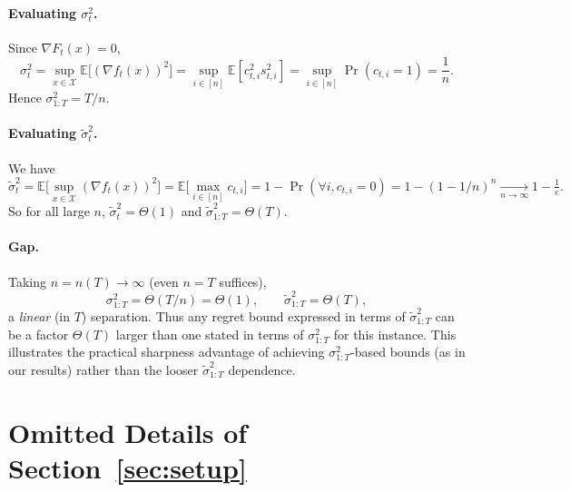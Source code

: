 \documentclass{article}
\theoremstyle{plain}
\theoremstyle{definition}
\theoremstyle{remark}
\newcommand{\cX}{\mathcal{X}}
\renewcommand{\Bbb}{\mathbb}
\newcommand{\E}{{\Bbb E}}
\renewcommand{\tilde}{\widetilde}
\begin{document}
\paragraph{Evaluating $\sigma_t^2$.} Since $\nabla F_t(x)=0$,
\[
\sigma_t^2=\sup_{x\in\cX}\E\big[(\nabla f_t(x))^2\big]=\sup_{i\in[n]}\E[c_{t,i}^2 s_{t,i}^2]
= \sup_{i\in[n]} \Pr(c_{t,i}=1)=\frac{1}{n}.
\]
Hence $\sigma_{1:T}^2 = T/n$.

\paragraph{Evaluating $\tilde{\sigma}_t^2$.} We have
\[
\tilde{\sigma}_t^2=\E\Big[\sup_{x\in\cX} (\nabla f_t(x))^2\Big]=\E\Big[\max_{i\in[n]} c_{t,i}\Big]
=1-\Pr(\forall i, c_{t,i}=0)=1-(1-1/n)^n \xrightarrow[n\to\infty]{} 1-\tfrac{1}{e}.
\]
So for all large $n$, $\tilde{\sigma}_t^2=\Theta(1)$ and $\tilde{\sigma}_{1:T}^2=\Theta(T)$.

\paragraph{Gap.} Taking $n=n(T)\to\infty$ (even $n=T$ suffices),
\begin{equation*}
\sigma_{1:T}^2 = \Theta(T/n)=\Theta(1),\qquad \tilde{\sigma}_{1:T}^2=\Theta(T),
\end{equation*}
a \emph{linear} (in $T$) separation. Thus any regret bound expressed in terms of $\tilde{\sigma}_{1:T}^2$ can be a factor $\Theta(T)$ larger than one stated in terms of $\sigma_{1:T}^2$ for this instance. This illustrates the practical sharpness advantage of achieving $\sigma_{1:T}^2$-based bounds (as in our results) rather than the looser $\tilde{\sigma}_{1:T}^2$ dependence.
\fi


\section{Omitted Details of Section~\ref{sec:setup}}
\end{document}
